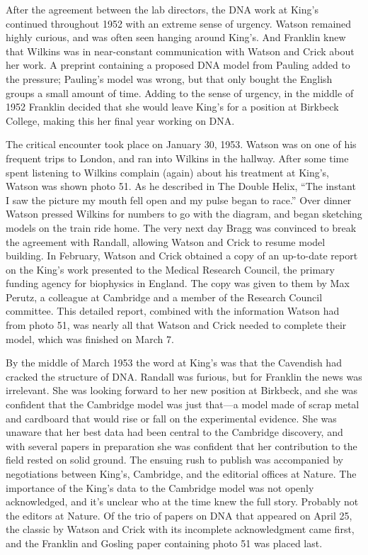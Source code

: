 \documentclass[12pt]{article}
\begin{document}
After the agreement between the lab directors, the DNA work at King's continued
throughout 1952 with an extreme sense of urgency. Watson remained highly
curious, and was often seen hanging around King's. And Franklin knew that
Wilkins was in near-constant communication with Watson and Crick about her
work. A preprint containing a proposed DNA model from Pauling added to the
pressure; Pauling's model was wrong, but that only bought the English groups a
small amount of time. Adding to the sense of urgency, in the middle of 1952
Franklin decided that she would leave King's for a position at Birkbeck
College, making this her final year working on DNA. 

The critical encounter took place on January 30, 1953. Watson was on one of his
frequent trips to London, and ran into Wilkins in the hallway. After some time
spent listening to Wilkins complain (again) about his treatment at King's,
Watson was shown photo 51. As he described in The Double Helix, ``The instant I
saw the picture my mouth fell open and my pulse began to race.'' Over dinner
Watson pressed Wilkins for numbers to go with the diagram, and began sketching
models on the train ride home. The very next day Bragg was convinced to break
the agreement with Randall, allowing Watson and Crick to resume model building.
In February, Watson and Crick obtained a copy of an up-to-date report on the
King's work presented to the Medical Research Council, the primary funding
agency for biophysics in England. The copy was given to them by Max Perutz, a
colleague at Cambridge and a member of the Research Council committee. This
detailed report, combined with the information Watson had from photo 51, was
nearly all that Watson and Crick needed to complete their model, which was
finished on March 7.

By the middle of March 1953 the word at King's was that the Cavendish had
cracked the structure of DNA. Randall was furious, but for Franklin the news
was irrelevant. She was looking forward to her new position at Birkbeck, and
she was confident that the Cambridge model was just that---a model made of
scrap metal and cardboard that would rise or fall on the experimental evidence.
She was unaware that her best data had been central to the Cambridge discovery,
and with several papers in preparation she was confident that her contribution
to the field rested on solid ground. The ensuing rush to publish was
accompanied by negotiations between King's, Cambridge, and the editorial
offices at Nature. The importance of the King's data to the Cambridge model was
not openly acknowledged, and it's unclear who at the time knew the full story.
Probably not the editors at Nature. Of the trio of papers on DNA that appeared
on April 25, the classic by Watson and Crick with its incomplete acknowledgment
came first, and the Franklin and Gosling paper containing photo 51 was placed
last.
\end{document}
